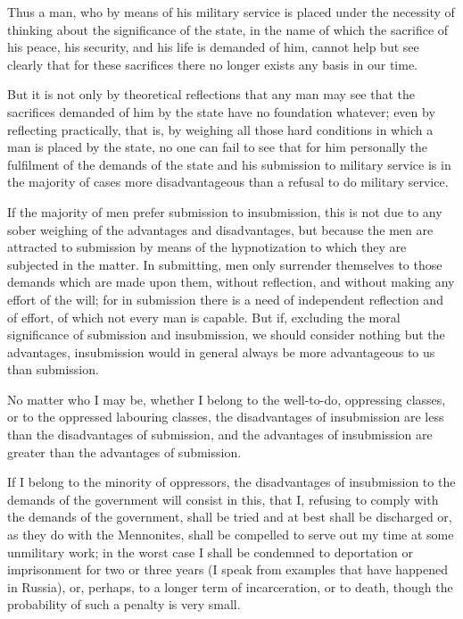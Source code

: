 \documentclass{book}
\begin{document}
Thus a man, who by means of his military service is placed under the necessity of thinking about the significance of the state, in the name of which the sacrifice of his peace, his security, and his life is demanded of him, cannot help but see clearly that for these sacrifices there no longer exists any basis in our time.

But it is not only by theoretical reflections that any man may see that the sacrifices demanded of him by the state have no foundation whatever; even by reflecting practically, that is, by weighing all those hard conditions in which a man is placed by the state, no one can fail to see that for him personally the fulfilment of the demands of the state and his submission to military service is in the majority of cases more disadvantageous than a refusal to do military service.

If the majority of men prefer submission to insubmission, this is not due to any sober weighing of the advantages and disadvantages, but because the men are attracted to submission by means of the hypnotization to which they are subjected in the matter. In submitting, men only surrender themselves to those demands which are made upon them, without reflection, and without making any effort of the will; for in submission there is a need of independent reflection and of effort, of which not every man is capable. But if, excluding the moral significance of submission and insubmission, we should consider nothing but the advantages, insubmission would in general always be more advantageous to us than submission.

No matter who I may be, whether I belong to the well-to-do, oppressing classes, or to the oppressed labouring classes, the disadvantages of insubmission are less than the disadvantages of submission, and the advantages of insubmission are greater than the advantages of submission.

If I belong to the minority of oppressors, the disadvantages of insubmission to the demands of the government will consist in this, that I, refusing to comply with the demands of the government, shall be tried and at best shall be discharged or, as they do with the Mennonites, shall be compelled to serve out my time at some unmilitary work; in the worst case I shall be condemned to deportation or imprisonment for two or three years (I speak from examples that have happened in Russia), or, perhaps, to a longer term of incarceration, or to death, though the probability of such a penalty is very small.
\end{document}
